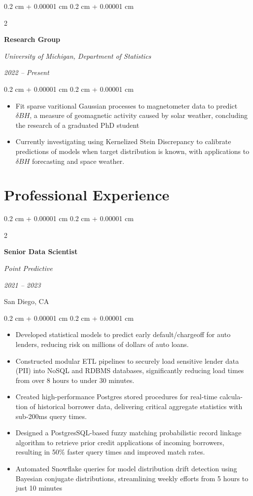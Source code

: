 \documentclass[11pt, letterpaper]{article}
\newenvironment{highlights}{
    \begin{itemize}[
        topsep=0.10 cm,
        parsep=0.10 cm,
        partopsep=0pt,
        itemsep=0pt,
        leftmargin=0.4 cm + 10pt
    ]
}{
    \end{itemize}
} %
\newenvironment{onecolentry}{
    \begin{adjustwidth}{
        0.2 cm + 0.00001 cm
    }{
        0.2 cm + 0.00001 cm
    }
}{
    \end{adjustwidth}
} %
\newenvironment{twocolentry}[2][]{
    \onecolentry
    \def\secondColumn{#2}
    \setcolumnwidth{\fill, 4.5 cm}
    \begin{paracol}{2}
}{
    \switchcolumn \raggedleft \secondColumn
    \end{paracol}
    \endonecolentry
} %
\begin{document}
\vspace{0.2 cm}
\begin{twocolentry}{\textit{2022 – Present}}
    \textbf{Research Group}

    \textit{University of Michigan, Department of Statistics}
\end{twocolentry}

\vspace{0.05 cm}
\begin{onecolentry}
    \begin{highlights}
        \item Fit sparse varitional Gaussian processes to magnetometer data to predict $\delta BH$, a measure of geomagnetic activity caused by solar weather,
        concluding the research of a graduated PhD student
        \item Currently investigating using Kernelized Stein Discrepancy to calibrate predictions of models when target distribution is known, with applications to $\delta BH$ forecasting and space weather.
    \end{highlights}
\end{onecolentry}



\section{Professional Experience}

\begin{twocolentry}{
    \textit{2021 – 2023} 

    San Diego, CA
    }
    \textbf{Senior Data Scientist}

    \textit{Point Predictive}
\end{twocolentry}

\begin{onecolentry}
    \begin{highlights}
        \item Developed statistical models to predict early default/chargeoﬀ for auto lenders,
        reducing risk on millions of dollars of auto loans.
        \item Constructed modular ETL pipelines to securely load sensitive lender data (PII)
        into NoSQL and RDBMS databases, signiﬁcantly reducing load times from over 8
        hours to under 30 minutes.
        \item Created high-performance Postgres stored procedures for real-time calcula-
        tion of historical borrower data, delivering critical aggregate statistics with
        sub-200ms query times.
        \item Designed a PostgresSQL-based fuzzy matching probabilistic record linkage
        algorithm to retrieve prior credit applications of incoming borrowers, resulting
        in 50\% faster query times and improved match rates.
        \item Automated Snowﬂake queries for model distribution drift detection using Bayesian conjugate distributions, 
        streamlining weekly eﬀorts from 5 hours to just 10 minutes
    \end{highlights}
\end{onecolentry}
\end{document}
